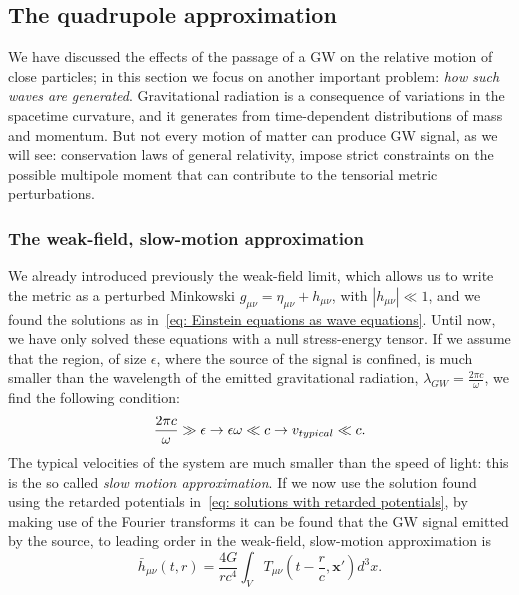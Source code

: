 \subsection{The quadrupole approximation}
We have discussed the effects of the passage of a GW on the relative motion of close particles; in this section we focus on another important problem: \textit{how such waves are generated}.
Gravitational radiation is a consequence of variations in the spacetime curvature, and it generates from time-dependent distributions of mass and momentum.
But not every motion of matter can produce GW signal, as we will see: conservation laws of general relativity, impose strict constraints on the possible multipole moment that can contribute to the tensorial metric perturbations.


\subsubsection{The weak-field, slow-motion approximation}
We already introduced previously the weak-field limit, which allows us to write the metric as a perturbed Minkowski $g_{\mu\nu}=\eta_{\mu\nu} + h_{\mu\nu}$, with $|h_{\mu\nu}|\ll 1$, and we found the solutions as in~\eqref{eq: Einstein equations as wave equations}.
Until now, we have only solved these equations with a null stress-energy tensor.
If we assume that the region, of size $\epsilon$, where the source of the signal is confined, is much smaller than the wavelength of the emitted gravitational radiation, $\lambda_{GW} = \frac{2\pi c}{\omega}$, we find the following condition:
\begin{equation}
    \frac{2\pi c}{\omega}\gg \epsilon \to \epsilon\omega \ll c \to v_{typical} \ll c.
    \notag
\end{equation}
The typical velocities of the system are much smaller than the speed of light: this is the so called \textit{slow motion approximation}.
If we now use the solution found using the retarded potentials in~\eqref{eq: solutions with retarded potentials}, by making use of the Fourier transforms it can be found that the GW signal emitted by the source, to leading order in the weak-field, slow-motion approximation is
\begin{equation}
    \bar{h}_{\mu\nu}(t,r) = \frac{4G}{rc^4}\int_V T_{\mu\nu}(t-\frac{r}{c}, \mathbf{x}')d^3x.
    \label{eq: weak-field slow-motion solutions}
\end{equation}

